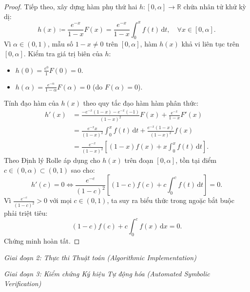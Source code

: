 \documentclass{article}
\begin{document}
\begin{proof}
Tiếp theo, xây dựng hàm phụ thứ hai $h: [0, \alpha] \to \mathbb{R}$ chứa nhân tử khử kỳ dị:
\begin{equation}
    h(x) \coloneqq \frac{e^{-x}}{1 - x} F(x) = \frac{e^{-x}}{1 - x} \int_0^x f(t)\,\mathrm{d}t, \quad \forall x \in [0, \alpha].
\end{equation}
Vì $\alpha \in (0, 1)$, mẫu số $1 - x \ne 0$ trên $[0, \alpha]$, hàm $h(x)$ khả vi liên tục trên $[0, \alpha]$.
Kiểm tra giá trị biên của $h$:
\begin{itemize}
    \item $h(0) = \frac{e^0}{1} F(0) = 0$.
    \item $h(\alpha) = \frac{e^{-\alpha}}{1 - \alpha} F(\alpha) = 0$ (do $F(\alpha) = 0$).
\end{itemize}
Tính đạo hàm của $h(x)$ theo quy tắc đạo hàm hàm phân thức:
\begin{align}
    h'(x) &= \frac{-e^{-x}(1 - x) - e^{-x}(-1)}{(1 - x)^2} F(x) + \frac{e^{-x}}{1 - x} F'(x) \nonumber \\
    &= \frac{e^{-x} x}{(1 - x)^2} \int_0^x f(t)\,\mathrm{d}t + \frac{e^{-x}(1 - x)}{(1 - x)^2} f(x) \nonumber \\
    &= \frac{e^{-x}}{(1 - x)^2} \left[ (1 - x) f(x) + x \int_0^x f(t)\,\mathrm{d}t \right].
\end{align}
Theo Định lý Rolle áp dụng cho $h(x)$ trên đoạn $[0, \alpha]$, tồn tại điểm $c \in (0, \alpha) \subset (0, 1)$ sao cho:
\begin{equation}
    h'(c) = 0 \iff \frac{e^{-c}}{(1 - c)^2} \left[ (1 - c) f(c) + c \int_0^c f(t)\,\mathrm{d}t \right] = 0.
\end{equation}
Vì $\frac{e^{-c}}{(1 - c)^2} > 0$ với mọi $c \in (0, 1)$, ta suy ra biểu thức trong ngoặc bắt buộc phải triệt tiêu:
\begin{equation}
    (1 - c) f(c) + c \int_0^c f(x)\,\mathrm{d}x = 0.
\end{equation}
Chứng minh hoàn tất.
\end{proof}

\vspace{0.5em}\noindent\emph{Giai đoạn 2: Thực thi Thuật toán (Algorithmic Implementation)}


\vspace{0.5em}\noindent\emph{Giai đoạn 3: Kiểm chứng Ký hiệu Tự động hóa (Automated Symbolic Verification)}

\end{document}
